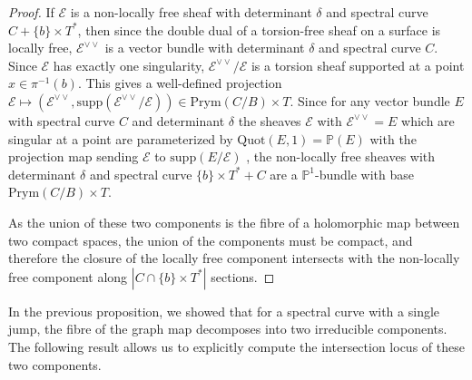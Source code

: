\documentclass{article}[12pt]
\theoremstyle{definition}
\theoremstyle{remark}
\numberwithin{equation}{section}
\newcommand \mc{\mathcal}
\newcommand \mb{\mathbb}
\begin{document}
\begin{proof}
	If $\mc{E}$ is a non-locally free sheaf with determinant $\delta$ and spectral curve $C+\{b\}\times T^*$, then since the double dual of a torsion-free sheaf on a surface is locally free, $\mc{E}^{\vee\vee}$ is a vector bundle with determinant $\delta$ and spectral curve $C$. Since $\mc{E}$ has exactly one singularity, $\mc{E}^{\vee\vee}/\mc{E}$ is a torsion sheaf supported at a point $x \in \pi^{-1}(b)$. This gives a well-defined projection $\mc{E}\mapsto (\mc{E}^{\vee\vee}, \text{supp}(\mc{E}^{\vee\vee}/\mc{E})) \in \text{Prym}(C/B)\times T$. Since for any vector bundle $E$ with spectral curve $C$ and determinant $\delta$ the sheaves $\mc{E}$ with $\mc{E}^{\vee\vee}=E$ which are singular at a point are parameterized by $\text{Quot}(E,1)=\mb{P}(E)$ with the projection map sending $\mc{E}$ to $\text{supp}(E/\mc{E})$ \cite{EilLehn}, the non-locally free sheaves with determinant $\delta$ and spectral curve $\{b\}\times T^*+C$ are a $\mb{P}^1$-bundle with base $\text{Prym}(C/B)\times T$.
	
	As the union of these two components is the fibre of a holomorphic map between two compact spaces, the union of the components must be compact, and therefore the closure of the locally free component intersects with the non-locally free component along $|C\cap \{b\}\times T^*|$ sections. 
\end{proof}

In the previous proposition, we showed that for a spectral curve with a single jump, the fibre of the graph map decomposes into two irreducible components. The following result allows us to explicitly compute the intersection locus of these two components.
\end{document}
